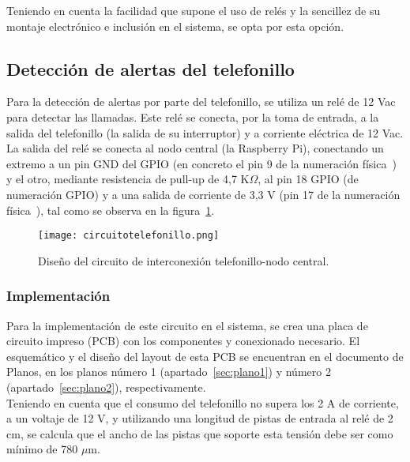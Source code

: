     Teniendo en cuenta la facilidad que supone el uso de relés y la sencillez de su montaje electrónico e inclusión en el sistema, se opta por esta opción.

    \subsection{Detección de alertas del telefonillo}

    Para la detección de alertas por parte del telefonillo, se utiliza un relé de 12 Vac para detectar las llamadas. Este relé se conecta, por la toma de entrada, a la salida del telefonillo (la salida de su interruptor) y a corriente eléctrica de 12 Vac. La salida del relé se conecta al nodo central (la Raspberry Pi), conectando un extremo a un pin GND del GPIO (en concreto el pin 9 de la numeración física~\cite{raspberrypigpio}) y el otro, mediante resistencia de pull-up de 4,7 K$\Omega$, al pin 18 GPIO (de numeración GPIO) y a una salida de corriente de 3,3 V (pin 17 de la numeración física~\cite{raspberrypigpio}), tal como se observa en la figura~\ref{circuitotelefonillo}.\\

    \begin{figure}[!ht]
      \centering
        \texttt{[image: circuitotelefonillo.png]}
      \caption{Diseño del circuito de interconexión telefonillo-nodo central.}
      \label{circuitotelefonillo}
    \end{figure}
    
        \subsubsection{Implementación}
    
        Para la implementación de este circuito en el sistema, se crea una placa de circuito impreso (PCB) con los componentes y conexionado necesario. El esquemático y el diseño del layout de esta PCB se encuentran en el documento de Planos, en los planos número 1 (apartado~\ref{sec:plano1}) y número 2 (apartado~\ref{sec:plano2}), respectivamente. \\
        
        Teniendo en cuenta que el consumo del telefonillo no supera los 2 A de corriente, a un voltaje de 12 V, y utilizando una longitud de pistas de entrada al relé de 2 cm, se calcula que el ancho de las pistas que soporte esta tensión debe ser como mínimo de 780 $\mu$m. \\
        
